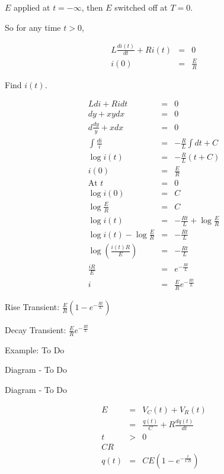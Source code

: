 \documentclass[a4paper,12pt]{article}
\begin{document}
$E$ applied at $t = - \infty$, then $E$ switched off at $T = 0$.

So for any time $t > 0$,

\begin{eqnarray*}
L \frac{di(t)}{dt} + R i(t) & = & 0 \\
i(0) & = & \frac{E}{R}
\end{eqnarray*}

Find $i(t)$.

\begin{eqnarray*}
L di + R i dt & = & 0 \\
dy + x y dx & = & 0 \\
d \frac{dy}{y} + x dx & = & 0 \\
\int \frac{di}{i} & = & - \frac{R}{L} \int dt + C \\
\log{i(t)} & = & - \frac{R}{L} (t + C) \\
i(0) & = & \frac{E}{R} \\
\mbox{At } t & = & 0 \\
\log{i(0)} & = & C \\
\log{\frac{E}{R}} & = & C \\
\log{i(t)} & = & - \frac{R t}{L} + \log{\frac{E}{R}} \\
\log{i(t)} - \log{\frac{E}{R}} & = & - \frac{R t}{L} \\
\log{\left( \frac{i(t) R}{E} \right)} & = & - \frac{R t}{L} \\
\frac{i R}{E} & = & e^{- \frac{R t}{L}} \\
i & = & \frac{E}{R} e^{- \frac{R t}{L}}
\end{eqnarray*}

Rise Transient: $\frac{E}{R} \left(1 - e^{-\frac{R t}{L}} \right)$

Decay Transient: $\frac{E}{R} e^{-\frac{R t}{L}}$


Example: To Do


\begin{table}[hbtp]

Diagram - To Do

\end{table}

\begin{table}[hbtp]

Diagram - To Do

\end{table}

\begin{eqnarray*}
E & = & V_{C}(t) + V_{R}(t) \\
  & = & \frac{q(t)}{C} + R \frac{d q(t)}{dt} \\
t & > & 0 \\
CR & & \\
q(t) &= &CE \left(1 - e^{-\frac{t}{CR}} \right)
\end{eqnarray*}
\end{document}
